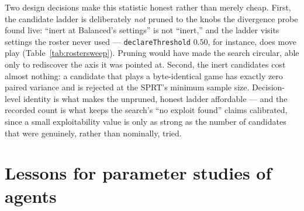 \documentclass[11pt]{article}
\newcommand{\code}[1]{\texttt{#1}}
\begin{document}
Two design decisions make this statistic honest rather than merely cheap. First, the candidate
ladder is deliberately \emph{not} pruned to the knobs the divergence probe found live: ``inert
at Balanced's settings'' is not ``inert,'' and the ladder visits settings the roster never used
--- \code{declareThreshold} $0.50$, for instance, does move play
(Table~\ref{tab:rostersweep}). Pruning would have made the search circular, able only to
rediscover the axis it was pointed at. Second, the inert candidates cost almost nothing: a
candidate that plays a byte-identical game has exactly zero paired variance and is rejected at
the SPRT's minimum sample size. Decision-level identity is what makes the unpruned, honest
ladder affordable --- and the recorded count is what keeps the search's ``no exploit found''
claims calibrated, since a small exploitability value is only as strong as the number of
candidates that were genuinely, rather than nominally, tried.

\section{Lessons for parameter studies of agents}
\label{sec:lessons}
\end{document}
